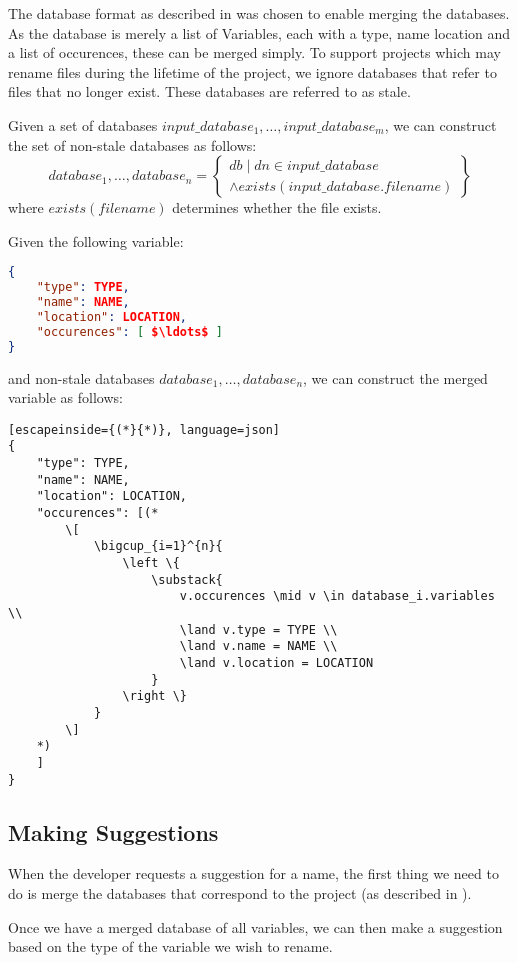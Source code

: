 The database format as described in  was chosen to enable
merging the databases.
As the database is merely a list of Variables, each with a type, name location
and a list of occurences, these can be merged simply.
To support projects which may rename files during the lifetime of the project,
we ignore databases that refer to files that no longer exist. These databases
are referred to as stale.

Given a set of databases $input\_database_1, \ldots, input\_database_m$, we can
construct the set of non-stale databases as follows:
\begin{equation}
	database_1, \ldots, database_n = \left \{
		\substack {
			db \mid dn \in input\_database \\
			\land exists(input\_database.filename)
		}
	\right \}
\end{equation}
where $exists(filename)$ determines whether the file exists.

Given the following variable:
\begin{lstlisting}[mathescape, language=json]
{
	"type": TYPE,
	"name": NAME,
	"location": LOCATION,
	"occurences": [ $\ldots$ ]
}
\end{lstlisting}
and non-stale databases $database_1, \ldots, database_n$, we can construct the
merged variable as follows:

\begin{lstlisting}[escapeinside={(*}{*)}, language=json]
{
	"type": TYPE,
	"name": NAME,
	"location": LOCATION,
	"occurences": [(*
		\[
			\bigcup_{i=1}^{n}{
				\left \{
					\substack{
						v.occurences \mid v \in database_i.variables \\
						\land v.type = TYPE \\
						\land v.name = NAME \\
						\land v.location = LOCATION
					}
				\right \}
			}
		\]
	*)
	]
}
\end{lstlisting}

\subsection{Making Suggestions}
\label{sec:suggesting}

When the developer requests a suggestion for a name, the first thing we need to
do is merge the databases that correspond to the project (as described in
).

Once we have a merged database of all variables, we can then make a suggestion
based on the type of the variable we wish to rename.

